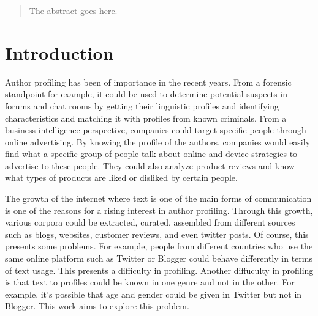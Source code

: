 \documentclass[conference]{IEEEtran}
\begin{document}




\maketitle

\begin{abstract}
The abstract goes here.
\end{abstract}





%
\IEEEpeerreviewmaketitle



\section{Introduction}
Author profiling has been of importance in the recent years. From a forensic standpoint for example, it could be used to determine potential suspects in forums and chat rooms by getting their linguistic profiles and identifying characteristics and matching it with profiles from known criminals. From a business intelligence perspective, companies could target specific people through online advertising. By knowing the profile of the authors, companies would easily find what a specific group of people talk about online and device strategies to advertise to these people. They could also analyze product reviews and know what types of products are liked or disliked by certain people. 

The growth of the internet where text is one of the main forms of communication is one of the reasons for a rising interest in author profiling. Through this growth, various corpora could be extracted, curated, assembled from different sources such as blogs, websites, customer reviews, and even twitter posts. Of course, this presents some problems. For example, people from different countries who use the same online platform such as Twitter or Blogger could behave differently in terms of text usage. This presents a difficulty in profiling. Another diffuculty in profiling is that text to profiles could be known in one genre and not in the other. For example, it's possible that age and gender could be given in Twitter but not in Blogger. This work aims to explore this problem. 
\end{document}
